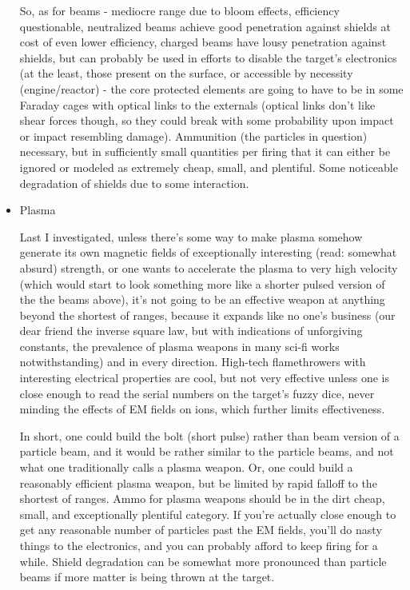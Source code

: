 \begin{itemize}
So, as for beams - mediocre range due to bloom effects, efficiency
questionable, neutralized beams achieve good penetration against
shields at cost of even lower efficiency, charged beams have lousy
penetration against shields, but can probably be used in efforts to
disable the target's electronics (at the least, those present on the
surface, or accessible by necessity (engine/reactor) - the core
protected elements are going to have to be in some Faraday cages with
optical links to the externals (optical links don't like shear forces
though, so they could break with some probability upon impact or
impact resembling damage). Ammunition (the particles in question)
necessary, but in sufficiently small quantities per firing that it can
either be ignored or modeled as extremely cheap, small, and
plentiful. Some noticeable degradation of shields due to some
interaction.


\item Plasma 

Last I investigated, unless there's some way to make plasma somehow
generate its own magnetic fields of exceptionally interesting (read:
somewhat absurd) strength, or one wants to accelerate the plasma to
very high velocity (which would start to look something more like a
shorter pulsed version of the the beams above), it's not going to be
an effective weapon at anything beyond the shortest of ranges, because
it expands like no one's business (our dear friend the inverse square
law, but with indications of unforgiving constants, the prevalence of
plasma weapons in many sci-fi works notwithstanding) and in every
direction. High-tech flamethrowers with interesting electrical
properties are cool, but not very effective unless one is close enough
to read the serial numbers on the target's fuzzy dice, never minding
the effects of EM fields on ions, which further limits effectiveness.

In short, one could build the bolt (short pulse) rather than beam
version of a particle beam, and it would be rather similar to the
particle beams, and not what one traditionally calls a plasma
weapon. Or, one could build a reasonably efficient plasma weapon, but
be limited by rapid falloff to the shortest of ranges. Ammo for plasma
weapons should be in the dirt cheap, small, and exceptionally
plentiful category. If you're actually close enough to get any
reasonable number of particles past the EM fields, you'll do nasty
things to the electronics, and you can probably afford to keep firing
for a while. Shield degradation can be somewhat more pronounced than
particle beams if more matter is being thrown at the target.


\end{itemize}
